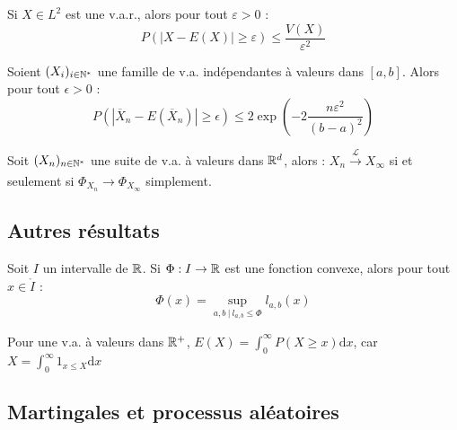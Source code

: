 \documentclass[11pt,a4paper]{article}
\begin{document}
\begin{corstar}
 Si $X\in L^2$ est une v.a.r., alors pour tout $\varepsilon >0$ :
\[P(|X-E(X)| \geq \varepsilon) \leq \frac{V(X)}{\varepsilon^2}\]
\end{corstar}

\begin{propstar}
Soient $(X_i)_{i\in \mathbb N^*}$ une famille de v.a. indépendantes à valeurs dans $[a,b]$. Alors pour tout $\epsilon > 0$ :
\[P( |\overline{X}_n - E(\overline{X}_n) | \geq \epsilon) \leq 2 \exp(-2\frac{n\varepsilon^2}{(b-a)^2})\]
\end{propstar}

\begin{thmstar}
[Lévy] Soit $(X_n)_{n\in \mathbb N^*}$ une suite de v.a. à valeurs dans $\mathbb R^d$, alors : $X_n \xrightarrow[]{\mathcal{L}} X_\infty$ si et seulement si $\Phi_{X_n} \to \Phi_{X_\infty}$ simplement.
\end{thmstar}
\subsection*{Autres résultats}

\begin{lemmastar}
Soit $I$ un intervalle de $\mathbb R$. Si $ \Phi :I \to \mathbb R$ est une fonction convexe, alors pour tout $x\in \mathring{I}$ :
\[\Phi(x) = \sup_{a,b \ | \ l_{a,b} \leq \Phi } l_{a,b}(x)\]
\end{lemmastar}

\begin{lemmastar}
Pour une v.a. à valeurs dans $\mathbb R^+$, $\displaystyle E(X)=\int_0^\infty P(X \geq x) \mathrm{d}x$, car $\displaystyle X=\int_0^\infty 1_{x\leq X} \mathrm{d}x$
\end{lemmastar} 


\newpage
\begin{center}
\section*{Martingales et processus aléatoires}
\end{center}


\end{document}
